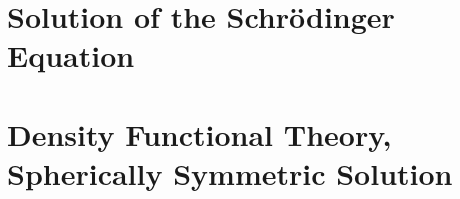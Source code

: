 \section{Solution of the Schr\"odinger Equation}

\section{Density Functional Theory, Spherically Symmetric Solution}
